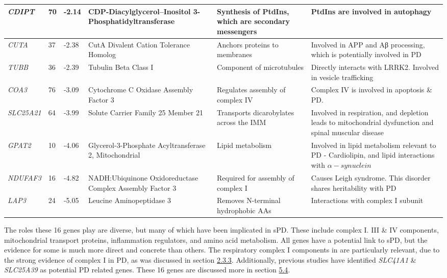 \documentclass{article}
\begin{document}
\begin{landscape}
\begin{table}[]
\begin{tabular}{|p{1.5cm}|p{1cm}|p{1cm}|p{5cm}|p{5cm}|p{8cm}|}
\textit{CDIPT}    & 70    & -2.14 & CDP-Diacylglycerol--Inositol   3-Phosphatidyltransferase     & Synthesis of PtdIns, which are   secondary messengers & PtdIns are involved in autophagy\cite{Zhang2021TargetingDisease} \\ \hline
\textit{CUTA}     & 37    & -2.38 & CutA Divalent Cation Tolerance   Homolog    & Anchors proteins to membranes  & Involved in APP and Aβ processing\cite{Hou2015TheGeneration}, which is potentially involved in PD\cite{Lim2019Amyloid-Disease} \\ \hline
\textit{TUBB}     & 36    & -2.39 & Tubulin Beta Class I  & Component of microtubules & Directly interacts with LRRK2\cite{Law2014AAcetylation}. Involved in vesicle trafficking\cite{Sferra2020TUBBDynamics}  \\ \hline
\textit{COA3}     & 76    & -3.09 & Cytochrome C Oxidase Assembly   Factor 3   & Regulates assembly of complex IV   & Complex IV is involved in apoptosis\cite{Vladimirov2013MolecularComplex} \& PD\cite{Li2021MitochondrialChain}. \\ \hline
\textit{SLC25A21} & 64    & -3.99 & Solute Carrier Family 25 Member   21  & Transports dicarobylates across   the IMM  & Involved in respiration, and   depletion leads to mitochondrial dysfunction and spinal muscular disease\cite{Boczonadi2018MitochondrialDisease} \\ \hline
\textit{GPAT2}    & 10    & -4.06 & Glycerol-3-Phosphate   Acyltransferase 2, Mitochondrial      & Lipid metabolism   & Involved in lipid metabolism relevant to PD - Cardiolipin\cite{Xicoy2019TheDisease.}, and lipid interactions with $\alpha-synuclein$\cite{Fanning2019LipidomicTreatment.}  \\ \hline
\textit{NDUFAF3}  & 16    & -4.82 & NADH:Ubiquinone Oxidoreductase   Complex Assembly Factor 3   & Required for assembly of complex   I   & Causes Leigh syndrome\cite{Baertling2017MutationsSyndrome}. This disorder shares heritability with PD\cite{Wahedi2023TranscriptomicGenes} \\ \hline
\textit{LAP3}     & 24    & -5.05 & Leucine Aminopeptidase 3  & Removes N-terminal hydrophobic AAs & Interactions with complex I subunit\cite{Guarani2014TIMMDC1/C3orf1Complex} \\ \hline
\end{tabular}
\end{table}
\end{landscape}
The roles these 16 genes play are diverse, but many of which have been implicated in  sPD. These include complex I. III \& IV components, mitochondrial transport proteins, inflammation regulators, and amino acid metabolism. All genes have a potential link to sPD, but the evidence for some is much more direct and concrete than others. The respiratory complex I components in are particularly relevant, due to the strong evidence of complex I in PD, as was discussed in section \hyperref[para:oxidative]{2.3.3}. Additionally, previous studies have identified \textit{SLC41A1} \& \textit{SLC25A39} as potential PD related genes. These 16 genes are discussed more in section \hyperref[subsec:wider]{5.4}.
\end{document}
